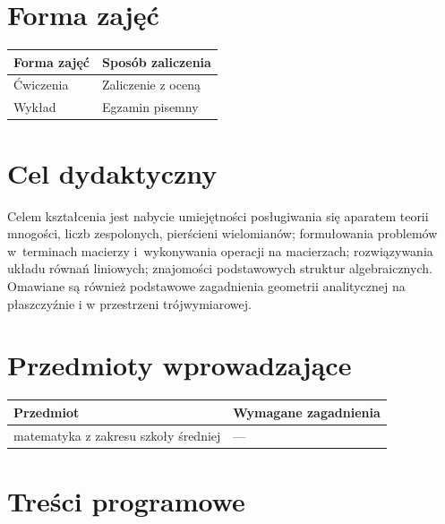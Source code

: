 \documentclass[12pt, a4paper]{article}
\begin{document}
\section{Forma zajęć}

\begin{tabular}{ll}
  \hline
  \textbf{Forma zajęć} & \textbf{Sposób zaliczenia} \\
  \hline
  Ćwiczenia & Zaliczenie z oceną \\
  Wykład & Egzamin pisemny \\
  \hline
\end{tabular}

\section{Cel dydaktyczny}

Celem kształcenia jest nabycie umiejętności posługiwania się aparatem teorii mnogości, liczb zespolonych, pierścieni wielomianów; formułowania problemów w terminach macierzy i wykonywania operacji na macierzach; rozwiązywania układu równań liniowych; znajomości podstawowych struktur algebraicznych. Omawiane są również podstawowe zagadnienia geometrii analitycznej na płaszczyźnie i w przestrzeni trójwymiarowej.

\section{Przedmioty wprowadzające}

\begin{tabularx}{\textwidth}{lX}
  \hline
  \textbf{Przedmiot} & \textbf{Wymagane zagadnienia} \\
  \hline
  matematyka z zakresu szkoły średniej & --- \\
  \hline
\end{tabularx}

\section{Treści programowe}
\end{document}
